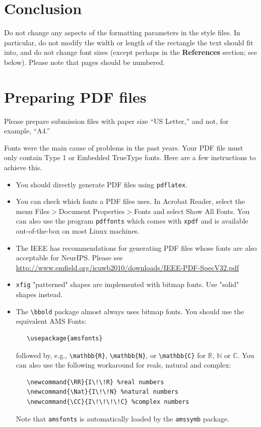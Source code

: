\documentclass{article}
\begin{document}
\section{Conclusion}\label{sec:conclusion}

Do not change any aspects of the formatting parameters in the style files.  In
particular, do not modify the width or length of the rectangle the text should
fit into, and do not change font sizes (except perhaps in the
\textbf{References} section; see below). Please note that pages should be
numbered.

\section{Preparing PDF files}

Please prepare submission files with paper size ``US Letter,'' and not, for
example, ``A4.''

Fonts were the main cause of problems in the past years. Your PDF file must only
contain Type 1 or Embedded TrueType fonts. Here are a few instructions to
achieve this.

\begin{itemize}

\item You should directly generate PDF files using \verb+pdflatex+.

\item You can check which fonts a PDF files uses.  In Acrobat Reader, select the
  menu Files$>$Document Properties$>$Fonts and select Show All Fonts. You can
  also use the program \verb+pdffonts+ which comes with \verb+xpdf+ and is
  available out-of-the-box on most Linux machines.

\item The IEEE has recommendations for generating PDF files whose fonts are also
  acceptable for NeurIPS. Please see
  \url{http://www.emfield.org/icuwb2010/downloads/IEEE-PDF-SpecV32.pdf}

\item \verb+xfig+ "patterned" shapes are implemented with bitmap fonts.  Use
  "solid" shapes instead.

\item The \verb+\bbold+ package almost always uses bitmap fonts.  You should use
  the equivalent AMS Fonts:
\begin{verbatim}
   \usepackage{amsfonts}
\end{verbatim}
followed by, e.g., \verb+\mathbb{R}+, \verb+\mathbb{N}+, or \verb+\mathbb{C}+
for $\mathbb{R}$, $\mathbb{N}$ or $\mathbb{C}$.  You can also use the following
workaround for reals, natural and complex:
\begin{verbatim}
   \newcommand{\RR}{I\!\!R} %real numbers
   \newcommand{\Nat}{I\!\!N} %natural numbers
   \newcommand{\CC}{I\!\!\!\!C} %complex numbers
\end{verbatim}
Note that \verb+amsfonts+ is automatically loaded by the \verb+amssymb+ package.

\end{itemize}
\end{document}
